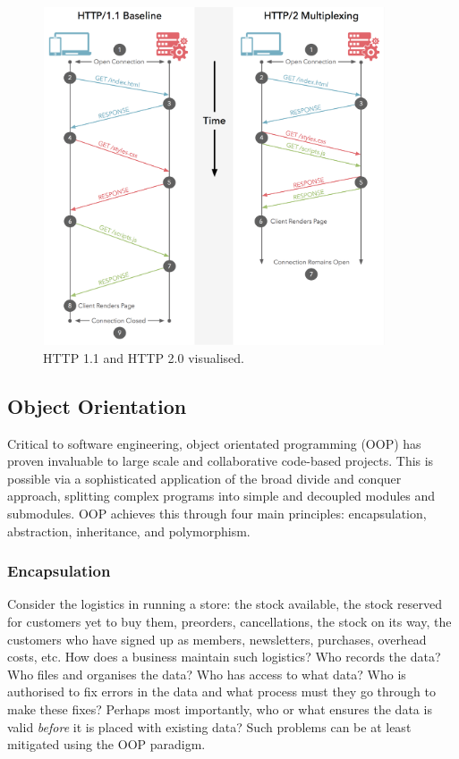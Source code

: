 \documentclass[11pt]{article}
\begin{document}
\begin{figure}[h!]
    \centering
    \includegraphics[width=0.9\textwidth]{figures/http1-vs-http2-multiplexing.png}
    \caption{HTTP 1.1 and HTTP 2.0 visualised.}
    \label{fig:http-visualised}
\end{figure}

\subsection{Object Orientation}

Critical to software engineering, object orientated programming (OOP) has proven invaluable to large scale and collaborative code-based projects. This is possible via a sophisticated application of the broad divide and conquer approach, splitting complex programs into simple and decoupled modules and submodules. OOP achieves this through four main principles: encapsulation, abstraction, inheritance, and polymorphism.

\subsubsection{Encapsulation}

Consider the logistics in running a store: the stock available, the stock reserved for customers yet to buy them, preorders, cancellations, the stock on its way, the customers who have signed up as members, newsletters, purchases, overhead costs, etc. How does a business maintain such logistics? Who records the data? Who files and organises the data? Who has access to what data? Who is authorised to fix errors in the data and what process must they go through to make these fixes? Perhaps most importantly, who or what ensures the data is valid \textit{before} it is placed with existing data? Such problems can be at least mitigated using the OOP paradigm.
\end{document}
